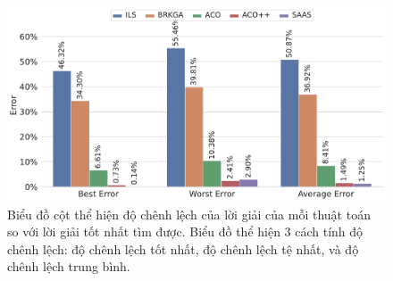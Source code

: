 \begin{figure}
  \centering
  \includegraphics[width=\linewidth]{Figures/error_rate.pdf}
  \caption[Kết quả thực nghiệm so sánh độ chênh lệch của lời giải của các thuật toán.]{Biểu đồ cột thể hiện độ chênh lệch của lời giải của mỗi thuật toán so với lời giải tốt nhất tìm được. Biểu đồ thể hiện 3 cách tính độ chênh lệch: độ chênh lệch tốt nhất, độ chênh lệch tệ nhất, và độ chênh lệch trung bình.}
  \label{fig:errorRate}
\end{figure}
